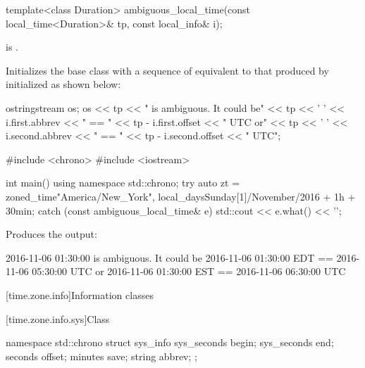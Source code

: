 %
\begin{itemdecl}
template<class Duration>
  ambiguous_local_time(const local_time<Duration>& tp, const local_info& i);
\end{itemdecl}

\begin{itemdescr}
\pnum
\expects
{} is .

\pnum
\effects
Initializes the base class with a sequence of 
equivalent to that produced by 
initialized as shown below:

\begin{codeblock}
ostringstream os;
os << tp << " is ambiguous.  It could be\n"
   << tp << ' ' << i.first.abbrev << " == "
   << tp - i.first.offset << " UTC or\n"
   << tp << ' ' << i.second.abbrev  << " == "
   << tp - i.second.offset  << " UTC";
\end{codeblock}

\pnum
\begin{example}
\begin{codeblock}
#include <chrono>
#include <iostream>

int main() {
  using namespace std::chrono;
  try {
    auto zt = zoned_time{"America/New_York",
                         local_days{Sunday[1]/November/2016} + 1h + 30min};
  } catch (const ambiguous_local_time& e) {
    std::cout << e.what() << '\n';
  }
}
\end{codeblock}

Produces the output:

\begin{outputblock}
2016-11-06 01:30:00 is ambiguous.  It could be
2016-11-06 01:30:00 EDT == 2016-11-06 05:30:00 UTC or
2016-11-06 01:30:00 EST == 2016-11-06 06:30:00 UTC
\end{outputblock}
\end{example}
\end{itemdescr}

[time.zone.info]{Information classes}

[time.zone.info.sys]{Class }

\begin{codeblock}
namespace std::chrono {
  struct sys_info {
    sys_seconds   begin;
    sys_seconds   end;
    seconds       offset;
    minutes       save;
    string        abbrev;
  };
}
\end{codeblock}

